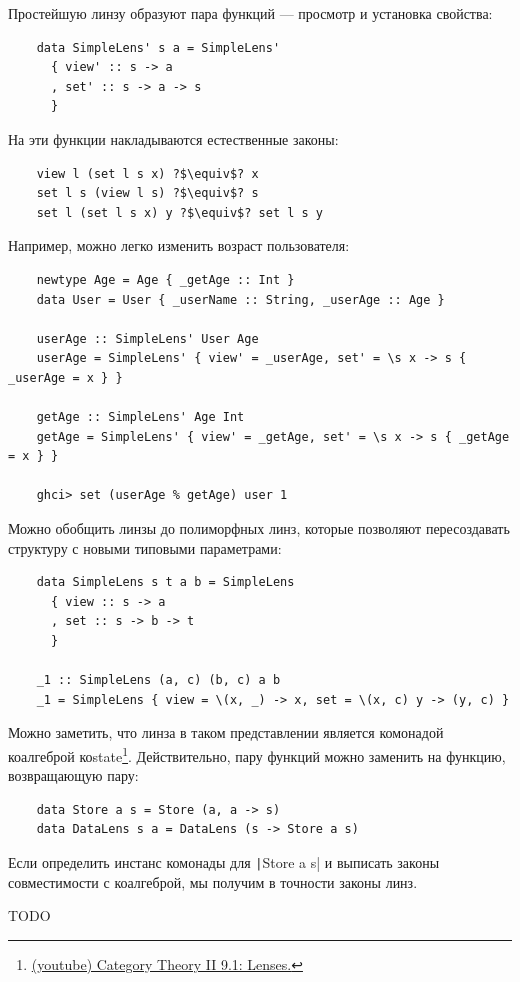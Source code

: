 Простейшую линзу образуют пара функций --- просмотр и установка свойства:
\begin{verbatim}
    data SimpleLens' s a = SimpleLens'
      { view' :: s -> a
      , set' :: s -> a -> s
      }
\end{verbatim}

На эти функции накладываются естественные законы:
\begin{verbatim}
    view l (set l s x) ?$\equiv$? x
    set l s (view l s) ?$\equiv$? s
    set l (set l s x) y ?$\equiv$? set l s y
\end{verbatim}

Например, можно легко изменить возраст пользователя:
\begin{verbatim}
    newtype Age = Age { _getAge :: Int }
    data User = User { _userName :: String, _userAge :: Age }

    userAge :: SimpleLens' User Age
    userAge = SimpleLens' { view' = _userAge, set' = \s x -> s { _userAge = x } }

    getAge :: SimpleLens' Age Int
    getAge = SimpleLens' { view' = _getAge, set' = \s x -> s { _getAge = x } }

    ghci> set (userAge % getAge) user 1
\end{verbatim}

Можно обобщить линзы до полиморфных линз, которые позволяют пересоздавать структуру с новыми типовыми параметрами:
\begin{verbatim}
    data SimpleLens s t a b = SimpleLens
      { view :: s -> a
      , set :: s -> b -> t
      }

    _1 :: SimpleLens (a, c) (b, c) a b
    _1 = SimpleLens { view = \(x, _) -> x, set = \(x, c) y -> (y, c) }
\end{verbatim}

Можно заметить, что линза в таком представлении является комонадой коалгеброй коstate\footnote{\href{https://youtu.be/9_iYlp8smc8?si=NLka0vnnhYDdTfgm}{(youtube) Category Theory II 9.1: Lenses.}}.
Действительно, пару функций можно заменить на функцию, возвращающую пару:
\begin{verbatim}
    data Store a s = Store (a, a -> s)
    data DataLens s a = DataLens (s -> Store a s)
\end{verbatim}

Если определить инстанс комонады для \texttt|Store a s| и выписать законы совместимости с коалгеброй, мы получим в точности законы линз.

TODO %

